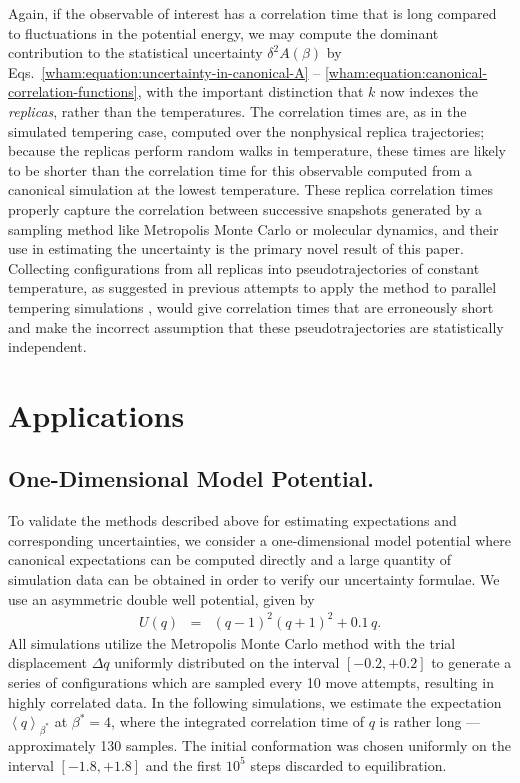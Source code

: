Again, if the observable of interest has a correlation time that is long compared to fluctuations in the potential energy, we may compute the dominant contribution to the statistical uncertainty $\delta^2 A(\beta)$ by Eqs.\ \ref{wham:equation:uncertainty-in-canonical-A} -- \ref{wham:equation:canonical-correlation-functions}, with the important distinction that $k$ now indexes the \emph{replicas}, rather than the temperatures.  The correlation times are, as in the simulated tempering case, computed over the nonphysical replica trajectories; because the replicas perform random walks in temperature, these times are likely to be shorter than the correlation time for this observable computed from a canonical simulation at the lowest temperature.  These replica correlation times properly capture the correlation between successive snapshots generated by a sampling method like Metropolis Monte Carlo or molecular dynamics, and their use in estimating the uncertainty is the primary novel result of this paper. Collecting configurations from all replicas into pseudotrajectories of constant temperature, as suggested in previous attempts to apply the method to parallel tempering simulations \cite{sugita:1999a}, would give correlation times that are erroneously short and make the incorrect assumption that these pseudotrajectories are statistically independent.


\section{Applications}
\label{wham:section:applications}

\subsection{One-Dimensional Model Potential.}
\label{wham:section:1D-model-potential}

To validate the methods described above for estimating expectations and corresponding uncertainties, we consider a one-dimensional model potential where canonical expectations can be computed directly and a large quantity of simulation data can be obtained in order to verify our uncertainty formulae.  We use an asymmetric double well potential, given by
\begin{eqnarray}
U(q) &=& (q-1)^2 (q+1)^2 + 0.1 \, q .
\end{eqnarray}
All simulations utilize the Metropolis Monte Carlo method \cite{metropolis:1953a} with the trial displacement $\Delta q$ uniformly distributed on the interval $[-0.2, +0.2]$ to generate a series of configurations which are sampled every 10 move attempts, resulting in highly correlated data.  In the following simulations, we estimate the expectation $\left< q \right>_{\beta^*}$ at $\beta^* = 4$, where the integrated correlation time of $q$ is rather long --- approximately 130 samples.  The initial conformation was chosen uniformly on the interval $[-1.8, +1.8]$ and the first $10^5$ steps discarded to equilibration.  

